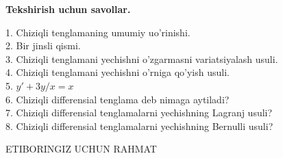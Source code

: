 \documentclass{beamer}
\begin{document}
\begin{frame}
\begin{center}
    \textbf{Tekshirish uchun savollar.}\\
\end{center}
  1. Chiziqli tenglamaning umumiy uo’rinishi. \\
  2. Bir jinsli qismi.\\
  3. Chiziqli tenglamani yechishni o’zgarmasni variatsiyalash usuli. \\
  4. Chiziqli tenglamani yechishni o’rniga qo’yish usuli.\\
  5. $y' + 3y/x = x$\\
  6. Chiziqli differensial tenglama deb nimaga aytiladi?\\
  7. Chiziqli differensial tenglamalarni yechishning Lagranj usuli?\\
  8. Chiziqli differensial tenglamalarni yechishning Bernulli usuli?\\
\end{frame}





\begin{frame}
\Huge{\centerline{ETIBORINGIZ UCHUN RAHMAT}}
\end{frame}


\end{document}
